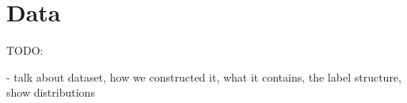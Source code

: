 \section{Data}
\label{sec:data}

TODO:

- talk about dataset, how we constructed it, what it contains, the label structure, show distributions
